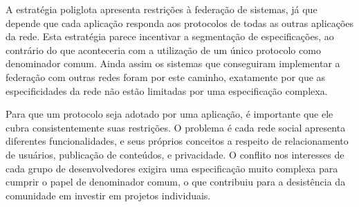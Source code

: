 
A estratégia poliglota apresenta restrições à federação de sistemas, já que depende
que cada aplicação responda aos protocolos de todas as outras aplicações da rede.
Esta estratégia parece incentivar a segmentação de especificações, ao contrário do
que aconteceria com a utilização de um único protocolo como denominador comum. Ainda
assim os sistemas que conseguiram implementar a federação com outras redes foram por
este caminho, exatamente por que as especificidades da rede não estão limitadas por
uma especificação complexa.

Para que um protocolo seja adotado por uma aplicação, é importante que ele cubra
consistentemente suas restrições. O problema é cada rede social apresenta diferentes
funcionalidades, e seus próprios conceitos a respeito de relacionamento de usuários,
publicação de conteúdos, e privacidade. O conflito nos interesses de cada grupo de
desenvolvedores exigira uma especificação muito complexa para cumprir o papel de
denominador comum, o que contribuiu para a desistência da comunidade em investir
em projetos individuais.





